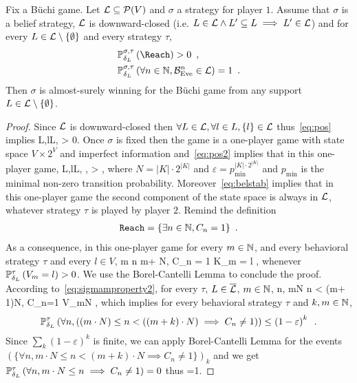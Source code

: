 \begin{lemma}\label{lem:borelcantelli}
{Fix a B\"uchi game.}
Let $\mathcal{L} \subseteq \mathcal{P}(V)$ 
and $\sigma$ a strategy for player $1$.
Assume that
$\sigma$ is a belief
strategy,
$\mathcal{L}$ is downward-closed
(i.e. $L\in\mathcal{L} \land L' \subseteq L \implies L'\in \mathcal{L}$)
and for every $L\in\mathcal{L}\setminus \{\emptyset\}$ and every strategy $\tau$,
\begin{align}
\label{eq:pos}
& \probimp{\sigma,\tau}{\delta_L}{\Reach} > 0\enspace,\\
 \label{eq:belstab}
&\probimp{\sigma,\tau}{\delta_L}{\forall n\in\NN,\belun^n\in \LL} = 1\enspace.
\end{align}
Then $\sigma$ is almost-surely winning for the B\"uchi game from any support 
$L\in \mathcal{L}\setminus \{\emptyset\}$. 
\end{lemma}
\begin{proof}
{
Since $\mathcal{L}$ is downward-closed then $\forall L\in \mathcal{L},\forall l\in L, \{l\}\in\mathcal{L}$
thus~\eqref{eq:pos} implies 
\be
\forall L\in \LL,\forall l\in L,
  > 0\enspace.
 \label{eq:pos2}
\ee 
}
{
Once $\sigma$ is fixed then the game is a one-player game with state space $V\times 2^V$ and imperfect information and~\eqref{eq:pos2} implies that in this one-player game,
\be
\label{eq:sigmamproperty}
\forall L\in \LL,\forall l\in L, \forall \tau,
  > \varepsilon\enspace,
 \ee
where $N=|K|\cdot 2^{|K|}$
and $\varepsilon = p_{\min}^{|K|\cdot 2^{|K|}}$
and $p_{\min}$ is the minimal non-zero transition probability.
Moreover~\eqref{eq:belstab} implies that
in this one-player game the second component of the state space is always in $\mathcal{L}$, whatever strategy $\tau$ is played by player $2$.
Remind the definition
 \begin{align*}
 {\tt Reach}=\{\exists n\in\mathbb{N}, C_n  = 1\}\enspace.
\end{align*}
As a consequence, in this one-player game
for every $m\in\mathbb{N}$,
and every behavioral strategy $\tau$ and every %
$l\in V$,
\be
\label{eq:sigmamproperty2}
{ \exists m \leq n \leq m+ N, C_n = 1 \mid
K_m = l
}
\geq \varepsilon,
\ee
whenever $\mathbb{P}^{\tau}_{\delta_L}\left({V_m=l}\right) > 0$.
}
We use the Borel-Cantelli Lemma to conclude the proof.
According to~\eqref{eq:sigmamproperty2},
for every $\tau$, $L\in\overline{\mathcal{L}}$, 
$m\in \mathbb{N}$,
\be
{}
{ \exists n, mN \leq n < (m+ 1)N, C_n=1
\mid V_{mN}
}
\geq \varepsilon,
\ee
which implies for every behavioral strategy $\tau$ and $k,m\in\mathbb{N}$,
\[
\mathbb{P}^{\tau}_{\delta_L}\left({\forall n,  \left((m\cdot N) \leq n < ((m+k) \cdot N) \implies  C_n \neq 1 \right)}\right)\leq  \left(1 - \varepsilon\right)^k\enspace.
\]
Since $\sum_k \left(1 - \varepsilon\right)^k$ is finite,
we can apply Borel-Cantelli Lemma for the events 
$(\{\forall n, m\cdot N \leq n < (m+k) \cdot N \implies  C_n\neq 1\})_k$
and we get
$\nonumber
\mathbb{P}^{\tau}_{\delta_L}\left({\forall n, m\cdot N \leq n  \implies  C_n\neq 1}\right)=0
$
thus
\be\label{eq:assss}\nonumber
{}=1\enspace.
\ee


\end{proof}

